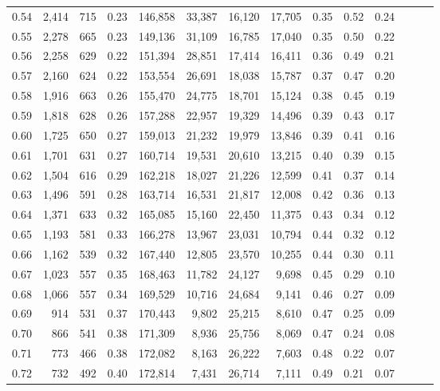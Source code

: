 \begin{tabular}{rrrrrrrrrrrrrr}
0.54 &  2,414 &  715 &  0.23 &  146,858 &   33,387 &  16,120 &  17,705 &  0.35 &  0.52 &      0.24 \\
0.55 &  2,278 &  665 &  0.23 &  149,136 &   31,109 &  16,785 &  17,040 &  0.35 &  0.50 &      0.22 \\
0.56 &  2,258 &  629 &  0.22 &  151,394 &   28,851 &  17,414 &  16,411 &  0.36 &  0.49 &      0.21 \\
0.57 &  2,160 &  624 &  0.22 &  153,554 &   26,691 &  18,038 &  15,787 &  0.37 &  0.47 &      0.20 \\
0.58 &  1,916 &  663 &  0.26 &  155,470 &   24,775 &  18,701 &  15,124 &  0.38 &  0.45 &      0.19 \\
0.59 &  1,818 &  628 &  0.26 &  157,288 &   22,957 &  19,329 &  14,496 &  0.39 &  0.43 &      0.17 \\
0.60 &  1,725 &  650 &  0.27 &  159,013 &   21,232 &  19,979 &  13,846 &  0.39 &  0.41 &      0.16 \\
0.61 &  1,701 &  631 &  0.27 &  160,714 &   19,531 &  20,610 &  13,215 &  0.40 &  0.39 &      0.15 \\
0.62 &  1,504 &  616 &  0.29 &  162,218 &   18,027 &  21,226 &  12,599 &  0.41 &  0.37 &      0.14 \\
0.63 &  1,496 &  591 &  0.28 &  163,714 &   16,531 &  21,817 &  12,008 &  0.42 &  0.36 &      0.13 \\
0.64 &  1,371 &  633 &  0.32 &  165,085 &   15,160 &  22,450 &  11,375 &  0.43 &  0.34 &      0.12 \\
0.65 &  1,193 &  581 &  0.33 &  166,278 &   13,967 &  23,031 &  10,794 &  0.44 &  0.32 &      0.12 \\
0.66 &  1,162 &  539 &  0.32 &  167,440 &   12,805 &  23,570 &  10,255 &  0.44 &  0.30 &      0.11 \\
0.67 &  1,023 &  557 &  0.35 &  168,463 &   11,782 &  24,127 &   9,698 &  0.45 &  0.29 &      0.10 \\
0.68 &  1,066 &  557 &  0.34 &  169,529 &   10,716 &  24,684 &   9,141 &  0.46 &  0.27 &      0.09 \\
0.69 &    914 &  531 &  0.37 &  170,443 &    9,802 &  25,215 &   8,610 &  0.47 &  0.25 &      0.09 \\
0.70 &    866 &  541 &  0.38 &  171,309 &    8,936 &  25,756 &   8,069 &  0.47 &  0.24 &      0.08 \\
0.71 &    773 &  466 &  0.38 &  172,082 &    8,163 &  26,222 &   7,603 &  0.48 &  0.22 &      0.07 \\
0.72 &    732 &  492 &  0.40 &  172,814 &    7,431 &  26,714 &   7,111 &  0.49 &  0.21 &      0.07 \\

\end{tabular}
